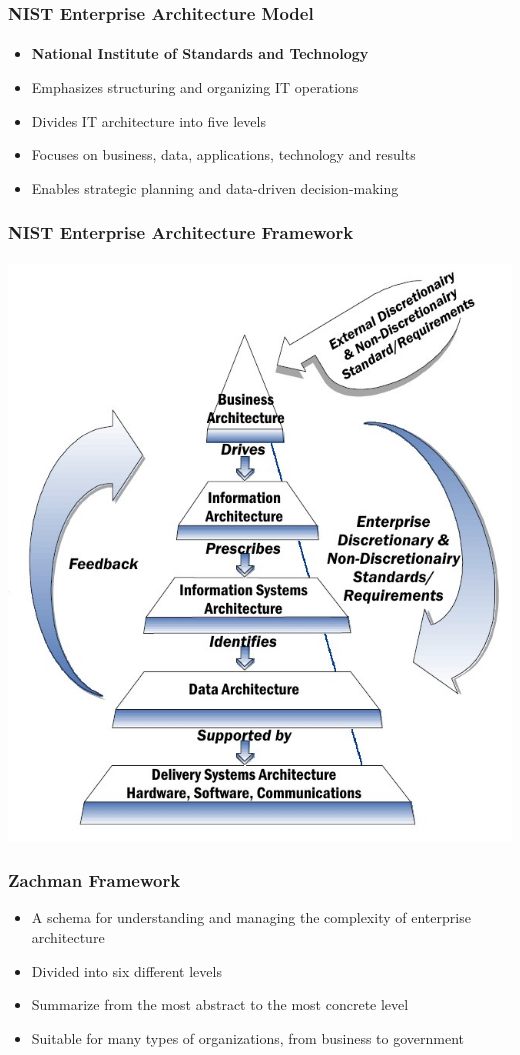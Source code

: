 \documentclass[aspectratio=169, table]{beamer}
\begin{document}
    \begin{frame}
        \frametitle{NIST Enterprise Architecture Model}
        \framesubtitle{\hspace{1cm}}
        \begin{itemize}
            \item  \textbf{National Institute of Standards and Technology}
            \item Emphasizes structuring and organizing IT operations
            \item Divides IT architecture into five levels
            \item Focuses on business, data, applications, technology and results
            \item Enables strategic planning and data-driven decision-making
        \end{itemize}
    \end{frame}

    {
        \begin{frame}
            \frametitle{NIST Enterprise Architecture Framework}
            \framesubtitle{\hspace{1cm}}
            \begin{center}
                \includegraphics[width=.40\textwidth]{../figures/nist}
            \end{center}
        \end{frame}
    }

    \begin{frame}
        \frametitle{Zachman Framework}
        \begin{itemize}
            \item A schema for understanding and managing the complexity of enterprise architecture
            \item Divided into six different levels
            \item Summarize from the most abstract to the most concrete level
            \item Suitable for many types of organizations, from business to government
        \end{itemize}
    \end{frame}
\end{document}
